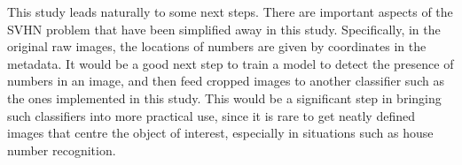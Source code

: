 \documentclass[12pt]{article}
\begin{document}
This study leads naturally to some next steps. There are important aspects of the SVHN problem that have been simplified away in this study. Specifically, in the original raw images, the locations of numbers are given by coordinates in the metadata. It would be a good next step to train a model to detect the presence of numbers in an image, and then feed cropped images to another classifier such as the ones implemented in this study. This would be a significant step in bringing such classifiers into more practical use, since it is rare to get neatly defined images that centre the object of interest, especially in situations such as house number recognition.\\

\medskip
\newpage

\renewcommand\refname{Bibliography}

 
\end{document}

